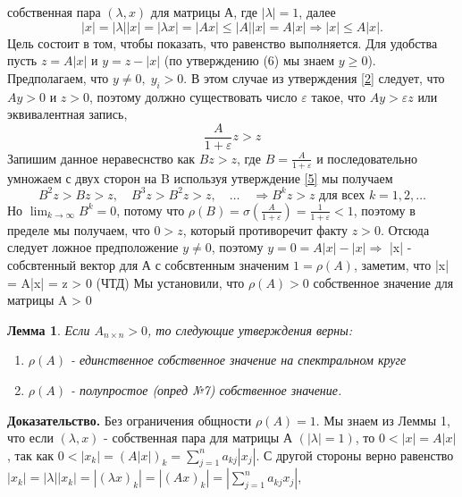 \documentclass[a4paper,12pt,leqno]{article} %
\newtheorem{lemma}[theorem]{Лемма}
\begin{document}
собственная пара $(\lambda, x)$ для матрицы А, где $|\lambda| = 1$, далее 
\begin{equation}
    |x| = |\lambda||x| = |\lambda x|= |Ax| \leq |A||x| = A|x| \Rightarrow |x| \leq A|x|.
\end{equation}
Цель состоит в том, чтобы показать, что равенство выполняется. Для удобства
пусть $z = A|x|$ и $y = z - |x|$ (по утверждению (6) мы знаем $y \geq 0$).
Предполагаем, что $y \neq 0, \; y_{i} > 0$. В этом случае из утверждения \eqref{2}
следует, что $Ay > 0$ и $z > 0$, поэтому должно существовать число $\varepsilon$
такое, что $Ay > \varepsilon z$ или эквивалентная запись, 
\begin{equation*}
    \frac{A}{1 + \varepsilon}z > z
\end{equation*}
Запишим данное неравеснство как $Bz > z$, где $B = \frac{A}{1 + \varepsilon}$
и последовательно умножаем с двух сторон на B используя утверждение \eqref{5}
мы получаем
\begin{equation*}
    B^2z > Bz > z, \quad B^3z > B^2z > z, \quad \dotsc \quad \Rightarrow B^kz > z
    \text{ для всех } k = 1, 2, \dotsc
\end{equation*} 
Но $\lim_{k \to \infty} B^k = 0$, потому что $\rho(B) = \sigma(\frac{A}{1 + \varepsilon}) =
\frac{1}{1 + \varepsilon} < 1$, поэтому в пределе мы получаем, 
что $0 > z$, который противоречит факту $z > 0$. Отсюда следует
ложное предположение $y \neq 0$, поэтому $y = 0 = A|x| - |x| \Rightarrow$
|x| - собсвтенный вектор для А с собсвтенным значеним $1 = \rho(A)$, 
заметим, что |x| = A|x| = z > 0 (ЧТД) \newline
Мы установили, что $\rho(A) > 0$  собственное значение для матрицы A > 0
\begin{lemma}
    Если $A_{n \times n} > 0$, то следующие утверждения верны:
    \begin{enumerate}
        \item $\rho(A)$ - единственное собственное значение на спектральном круге
        \item $\rho(A)$ - полупростое (опред №7) собственное значение.
    \end{enumerate}
\end{lemma}
\noindent\textbf{Доказательство.} 
Без ограничения общности $\rho(A) = 1$. Мы знаем из Леммы 1, что
если $(\lambda, x)$ - собственная пара для матрицы А $(|\lambda| = 1)$,
то $0 < |x| = A|x|$, так как 
$0 < |x_{k}| = (A|x|)_{k} = \sum^n_{j = 1}a_{kj}|x_{j}|$.
С другой стороны верно равенство 
$|x_{k}| = |\lambda||x_{k}| = |(\lambda x)_{k}|
 = |(Ax)_{k}| = |\sum^n_{j=1}a_{kj}x_{j}|$, 
\end{document}
